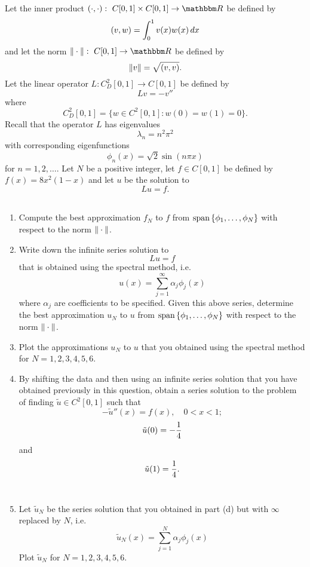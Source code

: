 
Let the inner product $\ip{\cdot,\cdot}:\mbox{ }C[0,1]\times C[0,1]\rightarrow\R$ be defined by
\[
(v,w)=\int_0^1v(x)w(x)\,dx
\]
and let the norm $\norm{\cdot}:\mbox{ }C[0,1]\rightarrow\R$ be defined by
\[
\|v\|=\sqrt{(v,v)}.
\]
Let the linear operator $L: C^2_D[0,1]\to C[0,1]$ be defined by
\[
L v = -v''
\]
where
\[
C^2_D[0,1] = \{ w \in C^2[0,1] : w(0) = w(1) = 0\}.
\]
Recall that the operator $L$ has eigenvalues
\[
\lambda_n = n^2 \pi^2
\]
with corresponding eigenfunctions
\[
\phi_n(x) = \sqrt{2} \sin(n \pi x)
\]
for $n=1,2,\ldots$. Let $N$ be a positive integer, let $f\in C[0,1]$ be defined by $f(x) = 8x^2(1-x)$ and let $u$ be the solution to
\[
Lu=f.
\]
\\
\begin{enumerate}
\item Compute the best approximation $f_N$ to $f$ from ${\rm span}\left\{\phi_1,\ldots,\phi_N\right\}$ with respect to the norm $\|\cdot\|$.
\\
\item Write down the infinite series solution to
\[
Lu=f
\]
that is obtained using the spectral method, i.e.
\[
u(x) = \sum_{j = 1}^\infty \alpha_j \phi_j(x)
\]
where $\alpha_j$ are coefficients to be specified.  Given this above series, determine the best approximation $u_N$ to $u$ from ${\rm span}\left\{\phi_1,\ldots,\phi_N\right\}$ with respect to the norm $\|\cdot\|$.
\\
\item Plot the approximations $u_N$ to $u$ that you obtained using the spectral method for $N=1,2,3,4,5,6$.
\\
\item By shifting the data and then using an infinite series solution that you have obtained previously in this question, obtain a series solution to the problem of finding $\tilde{u}\in C^2[0,1]$ such that
\[
-\tilde{u}''(x)=f(x),\quad 0<x<1;
\]
\[
\tilde{u}(0) = -{1\over 4}
\]
and
\[
\tilde{u}(1) = {1\over 4}.
\]
\\
\item Let $\tilde{u}_N$ be the series solution that you obtained in part (d) but with $\infty$ replaced by $N$, i.e.
\[
\tilde{u}_N(x) = \sum_{j = 1}^N \alpha_j \phi_j(x)
\]
Plot $\tilde{u}_N$ for $N=1,2,3,4,5,6$.
\end{enumerate}

           


